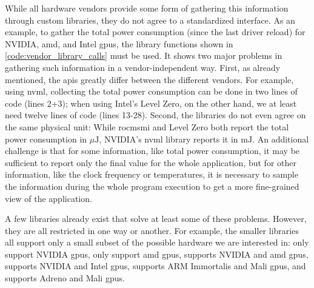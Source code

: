 While all hardware vendors provide some form of gathering this information through custom libraries, they do not agree to a standardized interface. 
As an example, to gather the total power consumption (since the last driver reload) for NVIDIA, \gls{amd}, and Intel \glspl{gpu}, the library functions shown in \autoref{code:vendor_library_calls} must be used.
It shows two major problems in gathering such information in a vendor-independent way. 
First, as already mentioned, the \glspl{api} greatly differ between the different vendors. 
For example, using \gls{nvml}, collecting the total power consumption can be done in two lines of code (lines 2+3); when using Intel's Level Zero, on the other hand, we at least need twelve lines of code (lines 13-28). 
Second, the libraries do not even agree on the same physical unit: While \gls{rocmsmi} and Level Zero both report the total power consumption in $\si{\mu\joule}$, NVIDIA's \gls{nvml} library reports it in $\si{\milli\joule}$.
An additional challenge is that for some information, like total power consumption, it may be sufficient to report only the final value for the whole application, but for other information, like the clock frequency or temperatures, it is necessary to sample the information during the whole program execution to get a more fine-grained view of the application. 


A few libraries already exist that solve at least some of these problems. 
However, they are all restricted in one way or another.
For example, the smaller libraries all support only a small subset of the possible hardware we are interested in: 
\cite{araf_verified_2020, leinardi_greenwithenvy_2024, noauthor_gpu_2024, guerreiro_gpgpu_2018} only support NVIDIA \glspl{gpu}, \cite{amd_amd_2024, noauthor_gpu_2023} only support \gls{amd} \glspl{gpu}, \cite{noauthor_ricks-lab_2024} supports NVIDIA and \gls{amd} \glspl{gpu}, \cite{benoit_courty_mlco2codecarbon_2024} supports NVIDIA and Intel \glspl{gpu}, \cite{noauthor_libgpucounters_2024} supports ARM Immortalis and Mali \glspl{gpu}, and \cite{google_hardwareperfcounter_2022} supports Adreno and Mali \glspl{gpu}.

